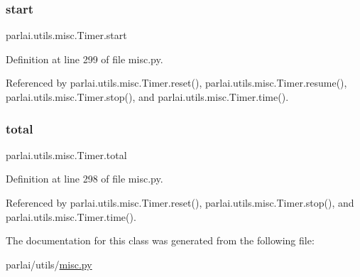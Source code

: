 \subsubsection{\texorpdfstring{start}{start}}
{\footnotesize\ttfamily parlai.\+utils.\+misc.\+Timer.\+start}



Definition at line 299 of file misc.\+py.



Referenced by parlai.\+utils.\+misc.\+Timer.\+reset(), parlai.\+utils.\+misc.\+Timer.\+resume(), parlai.\+utils.\+misc.\+Timer.\+stop(), and parlai.\+utils.\+misc.\+Timer.\+time().

\mbox{\label{classparlai_1_1utils_1_1misc_1_1Timer_a37214900a663640b33bdce9e6b3053dd}} 
\subsubsection{\texorpdfstring{total}{total}}
{\footnotesize\ttfamily parlai.\+utils.\+misc.\+Timer.\+total}



Definition at line 298 of file misc.\+py.



Referenced by parlai.\+utils.\+misc.\+Timer.\+reset(), parlai.\+utils.\+misc.\+Timer.\+stop(), and parlai.\+utils.\+misc.\+Timer.\+time().



The documentation for this class was generated from the following file\+:\begin{DoxyCompactItemize}
\item 
parlai/utils/\hyperlink{misc_8py}{misc.\+py}\end{DoxyCompactItemize}
